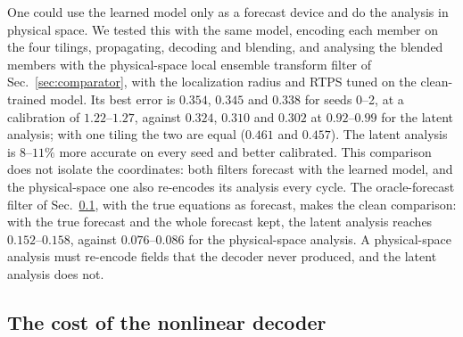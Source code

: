 One could use the learned
model only as a forecast device and do the analysis in physical space.
We tested this with the same model, encoding each member on the four
tilings, propagating, decoding and blending, and analysing the blended
members with the physical-space local ensemble transform filter of
Sec.~\ref{sec:comparator}, with the localization radius and RTPS tuned on the
clean-trained model.
Its best error is $0.354$, $0.345$ and $0.338$ for seeds 0--2, at a calibration of
$1.22$--$1.27$, against $0.324$, $0.310$ and $0.302$ at $0.92$--$0.99$ for the latent
analysis; with one tiling the two are equal ($0.461$ and $0.457$). The latent
analysis is $8$--$11\%$ more accurate on every seed and better calibrated.
This comparison does not isolate the coordinates: both filters forecast
with the learned model, and the physical-space one also re-encodes its
analysis every cycle. The oracle-forecast filter of
Sec.~\ref{sec:da_nonlinear}, with the true equations as forecast, makes
the clean comparison: with the true forecast and the whole forecast kept,
the latent analysis reaches $0.152$--$0.158$, against $0.076$--$0.086$ for the
physical-space analysis. A physical-space analysis must re-encode fields that the decoder never
produced, and the latent analysis does not.

\subsection{The cost of the nonlinear decoder}
\label{sec:da_nonlinear}

\begin{table}[htbp]
\caption{The cost of the nonlinear decoder, 2D KS at $44^2$, steady state. Analysis error (field units) on seeds
0/1/2, mean spread/error, nonlinearity index $\eta_o$ of the forecast ensemble (Eq.~\eqref{eq:nl_index}) and the
observation-space consistency ratio of the blended prior (1 for a consistent ensemble). Upper block: latent filters
with the learned model, $4\times64$ members unless stated. Lower block: perfect forecasts (oracle: true equations as forecast, latent analysis, best RTPS; 256-member physical-space filter on seed 0 only).}
\label{tab:nonlinear}
\end{table}

